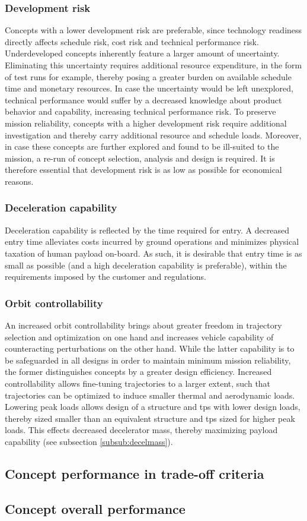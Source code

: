 \subsubsection{Development risk}
Concepts with a lower development risk are preferable, since technology readiness directly affects schedule risk, cost risk and technical performance risk. Underdeveloped concepts inherently feature a larger amount of uncertainty. Eliminating this uncertainty requires additional resource expenditure, in the form of test runs for example, thereby posing a greater burden on available schedule time and monetary resources. In case the uncertainty would be left unexplored, technical performance would suffer by a decreased knowledge about product behavior and capability, increasing technical performance risk. To preserve mission reliability, concepts with a higher development risk require additional investigation and thereby carry additional resource and schedule loads. Moreover, in case these concepts are further explored and found to be ill-suited to the mission, a re-run of concept selection, analysis and design is required. It is therefore essential that development risk is as low as possible for economical reasons.

\subsubsection{Deceleration capability}
Deceleration capability is reflected by the time required for entry. A decreased entry time alleviates costs incurred by ground operations and minimizes physical taxation of human payload on-board. As such, it is desirable that entry time is as small as possible (and a high deceleration capability is preferable), within the requirements imposed by the customer and regulations. 

\subsubsection{Orbit controllability}
An increased orbit controllability brings about greater freedom in trajectory selection and optimization on one hand and increases vehicle capability of counteracting perturbations on the other hand. While the latter capability is to be safeguarded in all designs in order to maintain minimum mission reliability, the former distinguishes concepts by a greater design efficiency. Increased controllability allows fine-tuning trajectories to a larger extent, such that trajectories can be optimized to induce smaller thermal and aerodynamic loads. Lowering peak loads allows design of a structure and \acrfull{tps} with lower design loads, thereby sized smaller than an equivalent structure and \gls{tps} sized for higher peak loads. This effects decreased decelerator mass, thereby maximizing payload capability (see subsection \ref{subsub:decelmass}).

\subsection{Concept performance in trade-off criteria}

\subsection{Concept overall performance}
